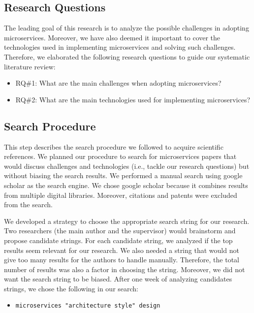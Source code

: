 \subsection{Research Questions}

The leading goal of this research is to analyze the possible challenges in adopting microservices. Moreover, we have also deemed it important to cover the technologies used in implementing microservices and solving such challenges. Therefore, we elaborated the following research questions to guide our systematic literature review:

\begin{itemize}
  \item RQ\#1: What are the main challenges when adopting microservices?
  \item RQ\#2: What are the main technologies used for implementing microservices?
\end{itemize}


\subsection{Search Procedure}

This step describes the search procedure we followed to acquire scientific references. 
We planned our procedure to search for microservices papers that would discuss challenges and technologies (i.e., tackle our research questions) but without biasing the search results. 
We performed a manual search using google scholar as the search engine. 
We chose google scholar because it combines results from multiple digital libraries. 
Moreover, citations and patents were excluded from the search.


We developed a strategy to choose the appropriate search string for our research. Two researchers (the main author and the supervisor) would brainstorm and propose candidate strings. For each candidate string, we analyzed if the top results seem relevant for our research. We also needed a string that would not give too many results for the authors to handle manually. Therefore, the total number of results was also a factor in choosing the string. Moreover, we did not want the search string to be biased. After one week of analyzing candidates strings, we chose the following in our search:

\begin{itemize}
    \item \texttt{microservices "architecture style" design}
\end{itemize}

